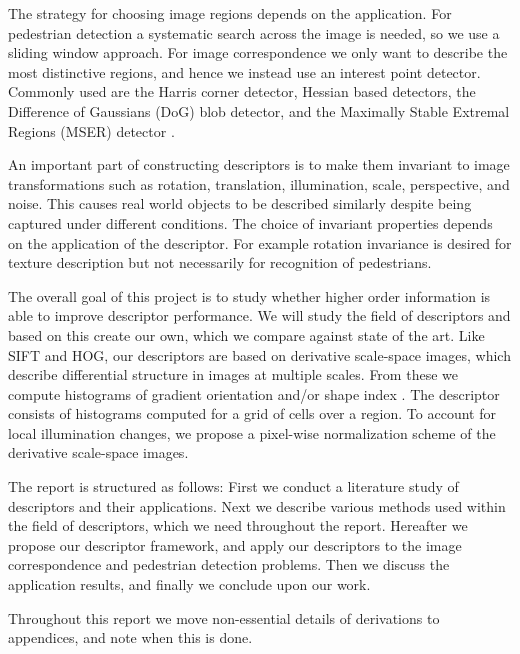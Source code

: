 \documentclass[thesis.tex]{subfiles}
\begin{document}
The strategy for choosing image regions depends on the application. For pedestrian detection a systematic search across the image is needed, so we use a sliding window approach. For image correspondence we only want to describe the most distinctive regions, and hence we instead use an interest point detector. Commonly used are the Harris corner detector, Hessian based detectors, the Difference of Gaussians (DoG) blob detector, and the Maximally Stable Extremal Regions (MSER) detector \cite{aanaes2012interesting,dahl2011finding}.

An important part of constructing descriptors is to make them invariant to image transformations such as rotation, translation, illumination, scale, perspective, and noise. This causes real world objects to be described similarly despite being captured under different conditions. The choice of invariant properties depends on the application of the descriptor. For example rotation invariance is desired for texture description but not necessarily for recognition of pedestrians.

The overall goal of this project is to study whether higher order information is able to improve descriptor performance. We will study the field of descriptors and based on this create our own, which we compare against state of the art. Like SIFT and HOG, our descriptors are based on derivative scale-space images, which describe differential structure in images at multiple scales. From these we compute histograms of gradient orientation and/or shape index \cite{koenderink1992surface}. The descriptor consists of histograms computed for a grid of cells over a region. To account for local illumination changes, we propose a pixel-wise normalization scheme of the derivative scale-space images.

The report is structured as follows: First we conduct a literature study of descriptors and their applications. Next we describe various methods used within the field of descriptors, which we need throughout the report. Hereafter we propose our descriptor framework, and apply our descriptors to the image correspondence and pedestrian detection problems. Then we discuss the application results, and finally we conclude upon our work.

Throughout this report we move non-essential details of derivations to appendices, and note when this is done.

\subbibliography
\end{document}
